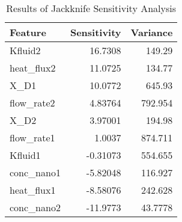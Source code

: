 
        \begin{table*}
            \centering
            \begin{tabular}{lrr}
\hline
 Feature     &   Sensitivity &   Variance \\
\hline
 Kfluid2     &      16.7308  &   149.29   \\
 heat\_flux2 &      11.0725  &   134.77   \\
 X\_D1       &      10.0772  &   645.93   \\
 flow\_rate2 &       4.83764 &   792.954  \\
 X\_D2       &       3.97001 &   194.98   \\
 flow\_rate1 &       1.0037  &   874.711  \\
 Kfluid1     &      -0.31073 &   554.655  \\
 conc\_nano1 &      -5.82048 &   116.927  \\
 heat\_flux1 &      -8.58076 &   242.628  \\
 conc\_nano2 &     -11.9773  &    43.7778 \\
\hline
\end{tabular}
            \caption{Results of Jackknife Sensitivity Analysis}
            \label{table-jackknife}
        \end{table*}
        
